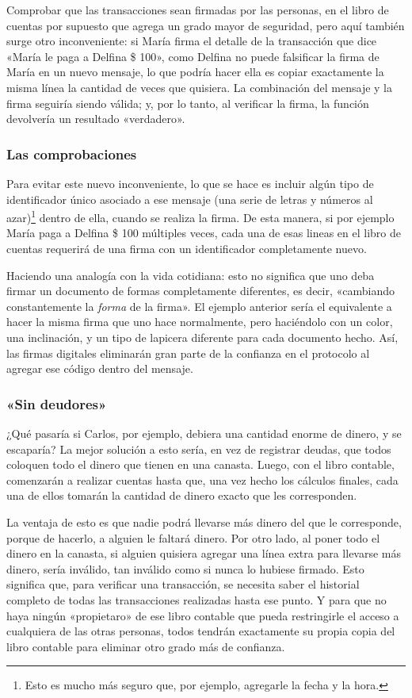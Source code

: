 \documentclass[12pt,a4paper,twoside]{book}
\begin{document}
Comprobar que las transacciones sean firmadas por las personas, en el libro de cuentas por supuesto que agrega un grado mayor de seguridad, pero aquí también surge otro inconveniente: si María firma el detalle de la transacción que dice «María le paga a Delfina \$ 100», como Delfina no puede falsificar la firma de María en un nuevo mensaje, lo que podría hacer ella es copiar exactamente la misma línea la cantidad de veces que quisiera. La combinación del mensaje y la firma seguiría siendo válida; y, por lo tanto, al verificar la firma, la función devolvería un resultado «verdadero».

\subsubsection{Las comprobaciones}
Para evitar este nuevo inconveniente, lo que se hace es incluir algún tipo de identificador único asociado a ese mensaje (una serie de letras y números al azar)\footnote{Esto es mucho más seguro que, por ejemplo, agregarle la fecha y la hora.} dentro de ella, cuando se realiza la firma. De esta manera, si por ejemplo María paga a Delfina \$ 100 múltiples veces, cada una de esas lineas en el libro de cuentas requerirá de una firma con un identificador completamente nuevo.

Haciendo una analogía con la vida cotidiana: esto no significa que uno deba firmar un documento de formas completamente diferentes, es decir, «cambiando constantemente la \textit{forma} de la firma». El ejemplo anterior sería el equivalente a hacer la misma firma que uno hace normalmente, pero haciéndolo con un color, una inclinación, y un tipo de lapicera diferente para cada documento hecho. Así, las firmas digitales eliminarán gran parte de la confianza en el protocolo al agregar ese código dentro del mensaje.

\subsubsection{«Sin deudores»}
¿Qué pasaría si Carlos, por ejemplo, debiera una cantidad enorme de dinero, y se escaparía? La mejor solución a esto sería, en vez de registrar deudas, que todos coloquen todo el dinero que tienen en una canasta. Luego, con el libro contable, comenzarán a realizar cuentas hasta que, una vez hecho los cálculos finales, cada una de ellos tomarán la cantidad de dinero exacto que les corresponden.

La ventaja de esto es que nadie podrá llevarse más dinero del que le corresponde, porque de hacerlo, a alguien le faltará dinero. Por otro lado, al poner todo el dinero en la canasta, si alguien quisiera agregar una línea extra para llevarse más dinero, sería inválido, tan inválido como si nunca lo hubiese firmado. Esto significa que, para verificar una transacción, se necesita saber el historial completo de todas las transacciones realizadas hasta ese punto. Y para que no haya ningún «propietaro» de ese libro contable que pueda restringirle el acceso a cualquiera de las otras personas, todos tendrán exactamente su propia copia del libro contable para eliminar otro grado más de confianza.
\end{document}
